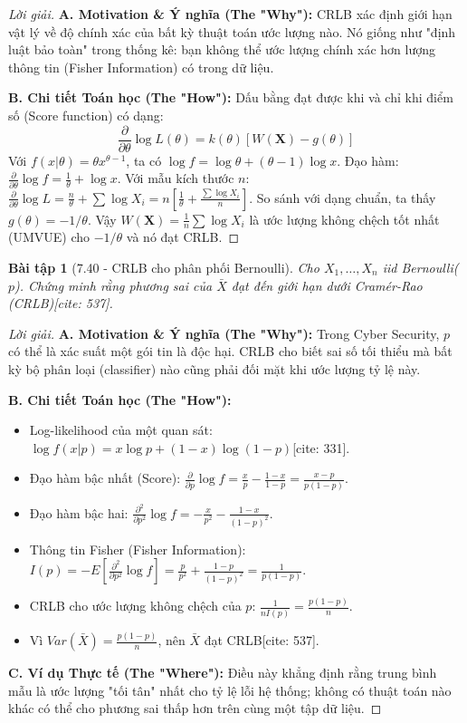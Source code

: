 \documentclass[8pt,a4paper]{article}
\newtheorem{exercise}{Bài tập}
\newenvironment{solution}{\begin{proof}[Lời giải]}{\end{proof}}
\begin{document}
\begin{solution}
\textbf{A. Motivation \& Ý nghĩa (The "Why"):} CRLB xác định giới hạn vật lý về độ chính xác của bất kỳ thuật toán ước lượng nào. Nó giống như "định luật bảo toàn" trong thống kê: bạn không thể ước lượng chính xác hơn lượng thông tin (Fisher Information) có trong dữ liệu.

\textbf{B. Chi tiết Toán học (The "How"):}
Dấu bằng đạt được khi và chỉ khi điểm số (Score function) có dạng:
\[ \frac{\partial}{\partial \theta} \log L(\theta) = k(\theta) [W(\mathbf{X}) - g(\theta)] \]
Với $f(x|\theta) = \theta x^{\theta-1}$, ta có $\log f = \log \theta + (\theta-1) \log x$.
Đạo hàm: $\frac{\partial}{\partial \theta} \log f = \frac{1}{\theta} + \log x$.
Với mẫu kích thước $n$: $\frac{\partial}{\partial \theta} \log L = \frac{n}{\theta} + \sum \log X_i = n \left[ \frac{1}{\theta} + \frac{\sum \log X_i}{n} \right]$.
So sánh với dạng chuẩn, ta thấy $g(\theta) = -1/\theta$. Vậy $W(\mathbf{X}) = \frac{1}{n} \sum \log X_i$ là ước lượng không chệch tốt nhất (UMVUE) cho $-1/\theta$ và nó đạt CRLB.
\end{solution}


\begin{exercise}[7.40 - CRLB cho phân phối Bernoulli]
Cho $X_1, \dots, X_n$ iid Bernoulli($p$). Chứng minh rằng phương sai của $\bar{X}$ đạt đến giới hạn dưới Cramér-Rao (CRLB)[cite: 537].
\end{exercise}

\begin{solution}
\textbf{A. Motivation \& Ý nghĩa (The "Why"):} Trong Cyber Security, $p$ có thể là xác suất một gói tin là độc hại. CRLB cho biết sai số tối thiểu mà bất kỳ bộ phân loại (classifier) nào cũng phải đối mặt khi ước lượng tỷ lệ này.

\textbf{B. Chi tiết Toán học (The "How"):}
\begin{itemize}
    \item Log-likelihood của một quan sát: $\log f(x|p) = x \log p + (1-x) \log(1-p)$[cite: 331].
    \item Đạo hàm bậc nhất (Score): $\frac{\partial}{\partial p} \log f = \frac{x}{p} - \frac{1-x}{1-p} = \frac{x-p}{p(1-p)}$.
    \item Đạo hàm bậc hai: $\frac{\partial^2}{\partial p^2} \log f = -\frac{x}{p^2} - \frac{1-x}{(1-p)^2}$.
    \item Thông tin Fisher (Fisher Information): $I(p) = -E[\frac{\partial^2}{\partial p^2} \log f] = \frac{p}{p^2} + \frac{1-p}{(1-p)^2} = \frac{1}{p(1-p)}$.
    \item CRLB cho ước lượng không chệch của $p$: $\frac{1}{n I(p)} = \frac{p(1-p)}{n}$.
    \item Vì $Var(\bar{X}) = \frac{p(1-p)}{n}$, nên $\bar{X}$ đạt CRLB[cite: 537].
\end{itemize}

\textbf{C. Ví dụ Thực tế (The "Where"):} Điều này khẳng định rằng trung bình mẫu là ước lượng "tối tân" nhất cho tỷ lệ lỗi hệ thống; không có thuật toán nào khác có thể cho phương sai thấp hơn trên cùng một tập dữ liệu.
\end{solution}
\end{document}
